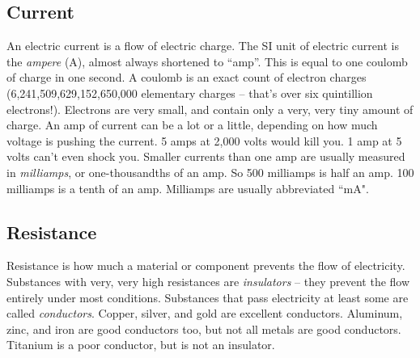 \bigskip



\subsection*{Current}

An electric current is a flow of electric charge. The SI unit of electric current is the \emph{ampere} (A), almost always shortened to ``amp''. This is equal to one coulomb of charge in one second. A coulomb is an exact count of electron charges (6,241,509,629,152,650,000 elementary charges -- that's over six quintillion electrons!). Electrons are very small, and contain only a very, very tiny amount of charge. An amp of current can be a lot or a little, depending on how much voltage is pushing the current. 5 amps at 2,000 volts would kill you. 1 amp at 5 volts can't even shock you. Smaller currents than one amp are usually measured in \emph{milliamps}, or one-thousandths of an amp. So 500 milliamps is half an amp. 100 milliamps is a tenth of an amp. Milliamps are usually abbreviated ``mA".

\bigskip




\subsection*{Resistance}

Resistance is how much a material or component prevents the flow of electricity. Substances with very, very high resistances are \emph{insulators} -- they prevent the flow entirely under most conditions. Substances that pass electricity at least some are called \emph{conductors}. Copper, silver, and gold are excellent conductors. Aluminum, zinc, and iron are good conductors too, but not all metals are good conductors. Titanium is a poor conductor, but is not an insulator. 

